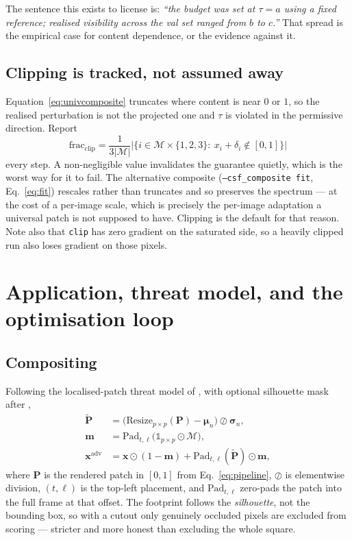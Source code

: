 \documentclass[11pt,a4paper]{article}
\begin{document}
The sentence this exists to license is: \emph{``the budget was set at
$\tau=a$ using a fixed reference; realised visibility across the val set
ranged from $b$ to $c$.''} That spread is the empirical case for content
dependence, or the evidence against it.

\subsection{Clipping is tracked, not assumed away}

Equation~\eqref{eq:univcomposite} truncates where content is near $0$ or
$1$, so the realised perturbation is not the projected one and $\tau$ is
violated in the permissive direction. Report
\begin{equation}
  \mathrm{frac_{clip}}
  = \frac{1}{3|\mathcal{M}|}
    \Big|\Big\{i\in\mathcal{M}\times\{1,2,3\}:\
    x_i+\delta_i\notin[0,1]\Big\}\Big|
  \label{eq:fracclip}
\end{equation}
every step. A non-negligible value invalidates the guarantee quietly, which
is the worst way for it to fail. The alternative composite
(\texttt{--csf\_composite fit}, Eq.~\eqref{eq:fit}) rescales rather than
truncates and so preserves the spectrum --- at the cost of a per-image
scale, which is precisely the per-image adaptation a universal patch is not
supposed to have. Clipping is the default for that reason. Note also that
\texttt{clip} has zero gradient on the saturated side, so a heavily clipped
run also loses gradient on those pixels.

\section{Application, threat model, and the optimisation loop}

\subsection{Compositing}

Following the localised-patch threat model of \citet{brown2017patch}, with
optional silhouette mask after \citet{tan2021lap},
\begin{align}
  \tilde{\mathbf{P}} &= \big(\mathrm{Resize}_{p\times p}(\mathbf{P})
     - \boldsymbol{\mu}_n\big)\oslash\boldsymbol{\sigma}_n,
     \label{eq:normalise}\\
  \mathbf{m} &= \mathrm{Pad}_{t,\ell}\big(\mathbb{1}_{p\times p}
     \odot\mathcal{M}\big), \label{eq:footprint}\\
  \mathbf{x}^{\mathrm{adv}} &= \mathbf{x}\odot(1-\mathbf{m})
     + \mathrm{Pad}_{t,\ell}(\tilde{\mathbf{P}})\odot\mathbf{m},
     \label{eq:apply}
\end{align}
where $\mathbf{P}$ is the rendered patch in $[0,1]$ from
Eq.~\eqref{eq:pipeline}, $\oslash$ is elementwise division, $(t,\ell)$ is
the top-left placement, and $\mathrm{Pad}_{t,\ell}$ zero-pads the patch into
the full frame at that offset. The footprint follows the \emph{silhouette},
not the bounding box, so with a cutout only genuinely occluded pixels are
excluded from scoring --- stricter and more honest than excluding the whole
square.
\end{document}
